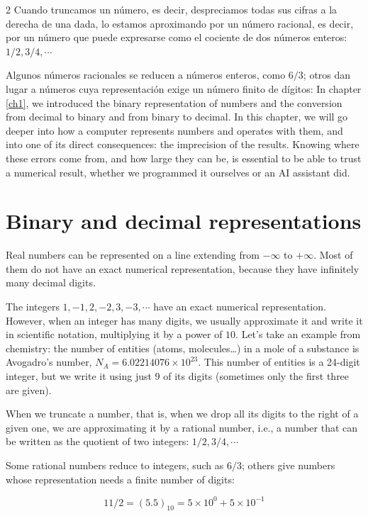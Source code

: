 \begin{paracol}{2}
 Cuando truncamos un número, es decir, despreciamos todas sus cifras a la derecha de una dada, lo estamos aproximando por un número racional, es decir, por un número que puede expresarse como el cociente de dos números enteros: $1/2, 3/4, \cdots$

Algunos números racionales se reducen a números enteros, como $6/3$; otros dan lugar a números cuya representación exige un número finito de dígitos:
\switchcolumn
In chapter \ref{ch1}, we introduced the binary representation of numbers and the conversion from decimal to binary and from binary to decimal. In this chapter, we will go deeper into how a computer represents numbers and operates with them, and into one of its direct consequences: the imprecision of the results. Knowing where these errors come from, and how large they can be, is essential to be able to trust a numerical result, whether we programmed it ourselves or an AI assistant did.

\section{Binary and decimal representations}

Real numbers can be represented on a line extending from $-\infty$ to $+\infty$. Most of them do not have an exact numerical representation, because they have infinitely many decimal digits.

The integers $1, -1, 2, -2, 3, -3, \cdots$ have an exact numerical representation.  However, when an integer has many digits, we usually approximate it and write it in scientific notation, multiplying it by a power of $10$. Let's take an example from chemistry: the number of entities (atoms, molecules\ldots) in a mole of a substance is Avogadro's number, $N_A = 6.02214076 \times 10^{23}$. This number of entities is a 24-digit integer, but we write it using just 9 of its digits (sometimes only the first three are given).

 When we truncate a number, that is, when we drop all its digits to the right of a given one, we are approximating it by a rational number, i.e., a number that can be written as the quotient of two integers: $1/2, 3/4, \cdots$

Some rational numbers reduce to integers, such as $6/3$; others give numbers whose representation needs a finite number of digits:
\end{paracol}
\begin{equation*}
11/2=(5.5)_{10}=5\times10^0+5\times10^{-1}
\end{equation*}

